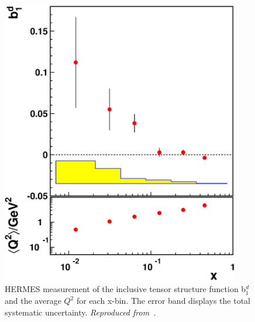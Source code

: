 \begin{figure}
\begin{center}
\includegraphics[angle=0,width=4.1in]{figs/b1final.eps}
\caption{\label{HERMES_B1D} HERMES measurement of the inclusive tensor structure function b$_1^d$ and the average $Q^2$ for each x-bin.  The error band displays the total systematic uncertainty.
{\it Reproduced from~\cite{Riedl:2005jq}.}}
\end{center}\end{figure}


